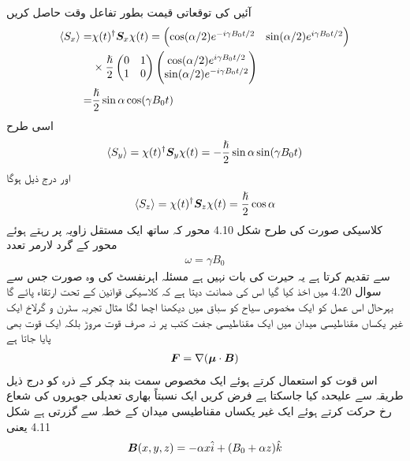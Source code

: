 آئیں  کی توقعاتی قیمت بطور تفاعل وقت حاصل کریں 
\begin{align}
\langle S_x \rangle =& \chi (t)^{\dagger} {{\boldsymbol{S}}}_x \chi (t) = 
\begin{pmatrix}
\cos(\alpha/2) e^{- i \gamma B_0 t/2} & \sin(\alpha/2) e^{i \gamma B_0 t/2} 
\end{pmatrix} \nonumber\\
& \times \frac{\hslash}{2}
\begin{pmatrix}
0 & 1 \\
1 & 0
\end{pmatrix}
\begin{pmatrix}
\cos(\alpha /2) e^{i \gamma B_0 t/2} \\
\sin(\alpha/2) e^{- i \gamma B_0 t/2}
\end{pmatrix} \nonumber \\
=& \frac{\hslash}{2} \sin \alpha \cos (\gamma B_0 t) 
\end{align}
اسی طرح 
\begin{align}
\langle S_y \rangle = \chi (t)^{\dagger} {{\boldsymbol{S}}}_y \chi (t) = - \frac{\hslash}{2} \sin \alpha \sin(\gamma B_0 t)
\end{align}
اور درج ذیل ہوگا 
\begin{align}
\langle S_z \rangle = \chi (t)^{\dagger} {{\boldsymbol{S}}}_z \chi (t) = \frac{\hslash}{2} \cos \alpha
\end{align}
کلاسیکی صورت کی طرح شکل 4.10 محور  کہ ساتھ  ایک مستقل زاویہ  پر رہتے ہوئے محور کے گرد لارمر تعدد 
\begin{align}
\omega = \gamma B_0
\end{align}
سے تقدیم کرتا ہے یہ حیرت کی بات نہیں ہے مسئلہ اہرنفسٹ کی وہ صورت جس سے سوال 4.20 میں اخذ کیا گیا اس کی ضمانت دیتا ہے کہ کلاسیکی قوانین کے تحت  ارتقاء پائے گا بہرحال اس عمل کو ایک مخصوص سیاح کو سباق میں دیکھنا اچھا لگا مثال 
تجربہ سٹرن و گرلاخ ایک غیر یکساں مقناطیسی میدان میں ایک مقناطیسی جفت کتب پر نہ صرف قوت مروڑ بلکہ ایک قوت بھی پایا جاتا ہے 
\begin{align}
{\ensuremath{{\boldsymbol{F}}}} = \nabla ({{\boldsymbol{\mu}}} \cdot {\ensuremath{{\boldsymbol{B}}}})
\end{align}
اس قوت کو استعمال کرتے ہوئے ایک مخصوص سمت بند چکر کے ذرہ کو درج ذیل طریقہ سے علیحدہ کیا جاسکتا ہے فرض کریں ایک نسبتاً بھاری تعدیلی جوہروں کی شعاع  رخ حرکت کرتے ہوئے ایک غیر یکساں مقناطیسی میدان کے خطہ سے گزرتی ہے شکل 4.11 یعنی 
\begin{align}
{\ensuremath{{\boldsymbol{B}}}} (x, y, z) = - \alpha x \hat{i} + (B_0 + \alpha z) \hat{k}
\end{align}
